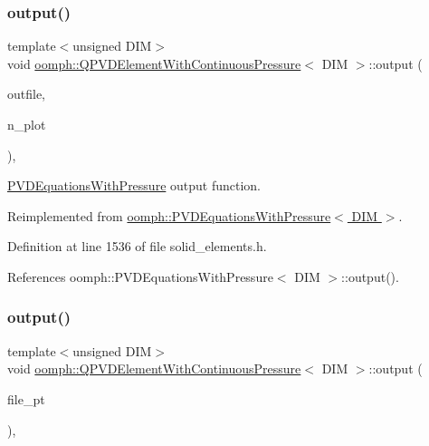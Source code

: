 \subsubsection{\texorpdfstring{output()}{output()}\hspace{0.1cm}{\footnotesize\ttfamily [2/4]}}
{\footnotesize\ttfamily template$<$unsigned D\+IM$>$ \\
void \hyperlink{classoomph_1_1QPVDElementWithContinuousPressure}{oomph\+::\+Q\+P\+V\+D\+Element\+With\+Continuous\+Pressure}$<$ D\+IM $>$\+::output (\begin{DoxyParamCaption}\item[{std\+::ostream \&}]{outfile,  }\item[{const unsigned \&}]{n\+\_\+plot }\end{DoxyParamCaption})\hspace{0.3cm}{\ttfamily [inline]}, {\ttfamily [virtual]}}



\hyperlink{classoomph_1_1PVDEquationsWithPressure}{P\+V\+D\+Equations\+With\+Pressure} output function. 



Reimplemented from \hyperlink{classoomph_1_1PVDEquationsWithPressure_a3522de42dcebba5f7531c5913857303d}{oomph\+::\+P\+V\+D\+Equations\+With\+Pressure$<$ D\+I\+M $>$}.



Definition at line 1536 of file solid\+\_\+elements.\+h.



References oomph\+::\+P\+V\+D\+Equations\+With\+Pressure$<$ D\+I\+M $>$\+::output().

\mbox{\label{classoomph_1_1QPVDElementWithContinuousPressure_ae44d9dd8f7a28dafd17e20a0408f4708}} 
\subsubsection{\texorpdfstring{output()}{output()}\hspace{0.1cm}{\footnotesize\ttfamily [3/4]}}
{\footnotesize\ttfamily template$<$unsigned D\+IM$>$ \\
void \hyperlink{classoomph_1_1QPVDElementWithContinuousPressure}{oomph\+::\+Q\+P\+V\+D\+Element\+With\+Continuous\+Pressure}$<$ D\+IM $>$\+::output (\begin{DoxyParamCaption}\item[{F\+I\+LE $\ast$}]{file\+\_\+pt }\end{DoxyParamCaption})\hspace{0.3cm}{\ttfamily [inline]}, {\ttfamily [virtual]}}



